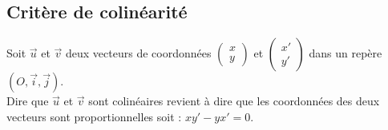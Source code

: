 \newpage


\subsection{Critère de colinéarité}

\begin{Propriété}
Soit $\overrightarrow{u}$ et $\overrightarrow{v}$ deux vecteurs de coordonnées $\begin{pmatrix} 
x \\
y
 \end{pmatrix}$ et  $\begin{pmatrix} 
x' \\
y'
 \end{pmatrix}$ dans un repère $(O,\overrightarrow{i},\overrightarrow{j})$. \\
Dire que $\overrightarrow{u}$ et $\overrightarrow{v}$ sont colinéaires revient à dire que les coordonnées des deux vecteurs sont proportionnelles soit : $xy'-yx'=0$. 
\end{Propriété}

